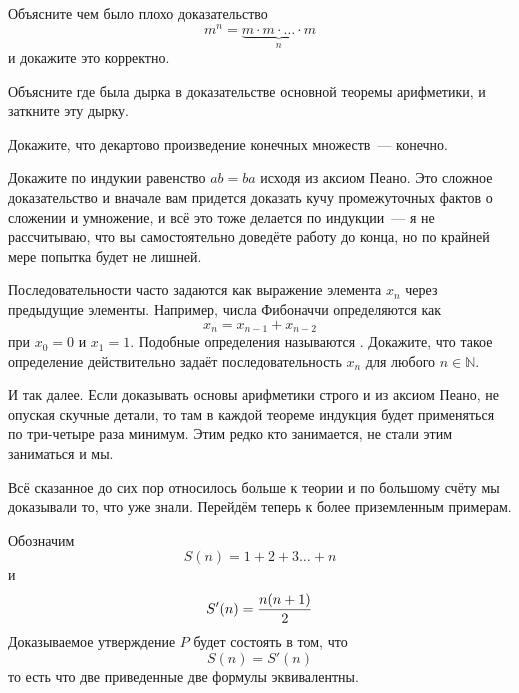 \begin{exercise}
Объясните чем было плохо доказательство
$$m^n = \underbrace{m\cdot m \cdot \ldots \cdot m}_n$$
и докажите это корректно.
\end{exercise}

\begin{exercise}
Объясните где была дырка в доказательстве основной теоремы арифметики, и заткните эту дырку.
\end{exercise}

\begin{exercise}
Докажите, что декартово произведение конечных множеств~— конечно.
\end{exercise}

\begin{exercise}
Докажите по индукии равенство $ab=ba$ исходя из аксиом Пеано. Это сложное доказательство и вначале вам придется доказать кучу промежуточных фактов о сложении и умножение, и всё это тоже делается по индукции~— я не рассчитываю, что вы самостоятельно доведёте работу до конца, но по крайней мере попытка будет не лишней.
\end{exercise}

\begin{exercise}
Последовательности часто задаются как выражение элемента $x_n$ через предыдущие элементы. Например, числа Фибоначчи определяются как
$$x_n = x_{n-1} + x_{n-2}$$
при $x_0 = 0$ и $x_1 = 1$. Подобные определения называются . Докажите, что такое определение действительно задаёт последовательность $x_n$ для любого $n\in\mathbb{N}$.
\end{exercise}

И так далее. Если доказывать основы арифметики строго и из аксиом Пеано, не опуская скучные детали, то там в каждой теореме индукция будет применяться по три-четыре раза минимум. Этим редко кто занимается, не стали этим заниматься и мы.

Всё сказанное до сих пор относилось больше к теории и по большому счёту мы доказывали то, что уже знали. Перейдём теперь к более приземленным примерам.

\begin{example}Обозначим
$$S(n) = 1 + 2 +3 \ldots + n$$
и
$$S'(n) = {n(n+1)\over 2}$$
Доказываемое утверждение $P$ будет состоять в том, что
$$S(n) = S'(n)$$
то есть что две приведенные две формулы эквивалентны.
\end{example}

